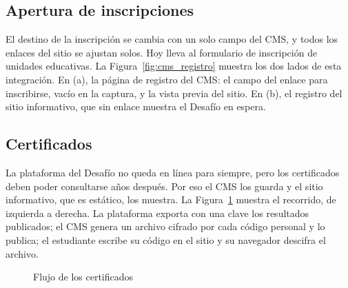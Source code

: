 {\estilotabla
}

\subsection{Apertura de inscripciones}

El destino de la inscripción se cambia con un solo campo del CMS, y todos los enlaces del sitio se ajustan solos. Hoy lleva al formulario de inscripción de unidades educativas. La Figura~\ref{fig:cms_registro} muestra los dos lados de esta integración. En (a), la página de registro del CMS: el campo del enlace para inscribirse, vacío en la captura, y la vista previa del sitio. En (b), el registro del sitio informativo, que sin enlace muestra el Desafío en espera.


\subsection{Certificados}

La plataforma del Desafío no queda en línea para siempre, pero los certificados deben poder consultarse años después. Por eso el CMS los guarda y el sitio informativo, que es estático, los muestra. La Figura~\ref{fig:flujo_certificados} muestra el recorrido, de izquierda a derecha. La plataforma exporta con una clave los resultados publicados; el CMS genera un archivo cifrado por cada código personal y lo publica; el estudiante escribe su código en el sitio y su navegador descifra el archivo.

\begin{figure}[H]
\centering
{}
\caption{Flujo de los certificados}
\label{fig:flujo_certificados}
\end{figure}

